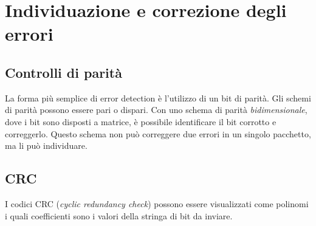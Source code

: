 \documentclass[11pt]{book}
\begin{document}
\section*{Individuazione e correzione degli errori}
\subsection*{Controlli di parità}
La forma più semplice di error detection è l'utilizzo di un bit di parità. Gli schemi di parità possono essere pari o dispari.
Con uno schema di parità \textit{bidimensionale}, dove i bit sono disposti a matrice, è possibile identificare il bit 
corrotto e correggerlo. Questo schema non può correggere due errori in un singolo pacchetto, ma li può individuare.
\subsection*{CRC}
I codici CRC (\textit{cyclic redundancy check}) possono essere visualizzati come polinomi i quali coefficienti sono i valori 
della stringa di bit da inviare.
\end{document}
